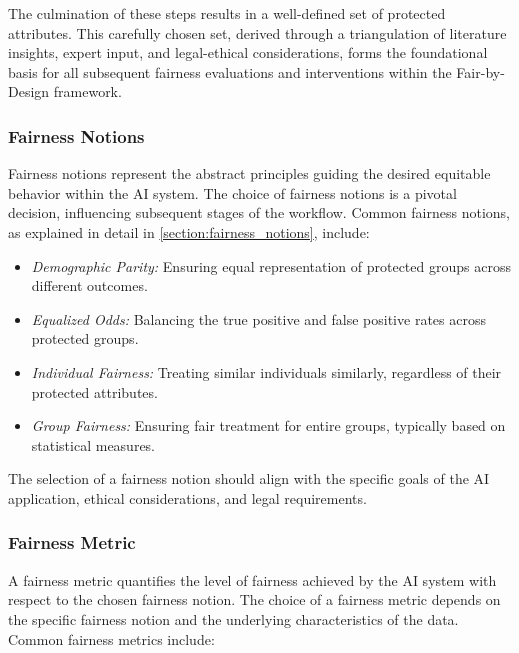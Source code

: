 The culmination of these steps results in a well-defined set of protected attributes. This carefully chosen set, derived through a triangulation of literature insights, expert input, and legal-ethical considerations, forms the foundational basis for all subsequent fairness evaluations and interventions within the Fair-by-Design framework.

\subsubsection{Fairness Notions}

Fairness notions represent the abstract principles guiding the desired equitable behavior within the AI system. The choice of fairness notions is a pivotal decision, influencing subsequent stages of the workflow. Common fairness notions, as explained in detail in \cref{section:fairness_notions}, include:

\begin{itemize}
  
    \item \emph{Demographic Parity:} Ensuring equal representation of protected groups across different outcomes.
  
    \item \emph{Equalized Odds:} Balancing the true positive and false positive rates across protected groups.
  
    \item \emph{Individual Fairness:} Treating similar individuals similarly, regardless of their protected attributes.
   
    \item \emph{Group Fairness:} Ensuring fair treatment for entire groups, typically based on statistical measures.

\end{itemize}

The selection of a fairness notion should align with the specific goals of the AI application, ethical considerations, and legal requirements.

\subsubsection{Fairness Metric}

A fairness metric quantifies the level of fairness achieved by the AI system with respect to the chosen fairness notion. The choice of a fairness metric depends on the specific fairness notion and the underlying characteristics of the data. Common fairness metrics include:


